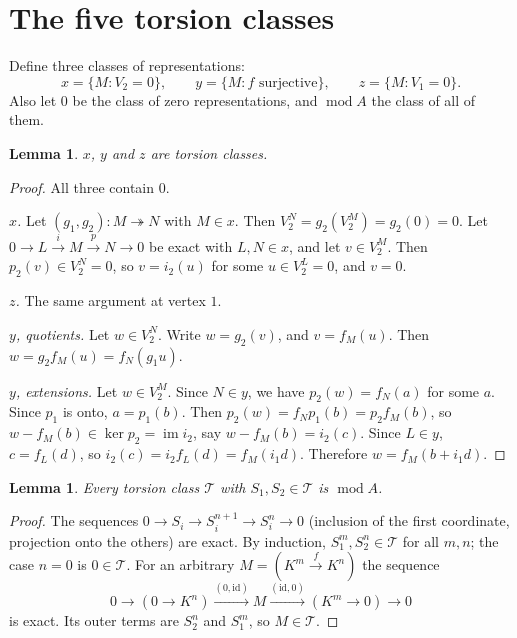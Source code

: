 \documentclass[11pt]{article}
\newtheorem{lemma}[theorem]{Lemma}
\theoremstyle{definition}
\theoremstyle{remark}
\newcommand{\md}{\operatorname{mod}}
\begin{document}
\section{The five torsion classes}

Define three classes of representations:
\[
x=\{M: V_2=0\},\qquad y=\{M: f\text{ surjective}\},\qquad z=\{M: V_1=0\}.
\]
Also let $0$ be the class of zero representations, and $\md A$ the class of all of them.

\begin{lemma}\label{lem:tors}
$x$, $y$ and $z$ are torsion classes.
\end{lemma}
\begin{proof}
All three contain $0$.

\emph{$x$.} Let $(g_1,g_2)\colon M\twoheadrightarrow N$ with $M\in x$. Then
$V_2^N=g_2(V_2^M)=g_2(0)=0$. Let $0\to L\xrightarrow{i}M\xrightarrow{p}N\to0$ be exact with
$L,N\in x$, and let $v\in V_2^M$. Then $p_2(v)\in V_2^N=0$, so $v=i_2(u)$ for some
$u\in V_2^L=0$, and $v=0$.

\emph{$z$.} The same argument at vertex $1$.

\emph{$y$, quotients.} Let $w\in V_2^N$. Write $w=g_2(v)$, and $v=f_M(u)$. Then
$w=g_2f_M(u)=f_N(g_1u)$.

\emph{$y$, extensions.} Let $w\in V_2^M$. Since $N\in y$, we have $p_2(w)=f_N(a)$ for some $a$.
Since $p_1$ is onto, $a=p_1(b)$. Then $p_2(w)=f_Np_1(b)=p_2f_M(b)$, so
$w-f_M(b)\in\ker p_2=\operatorname{im} i_2$, say $w-f_M(b)=i_2(c)$. Since $L\in y$, $c=f_L(d)$,
so $i_2(c)=i_2f_L(d)=f_M(i_1d)$. Therefore $w=f_M(b+i_1d)$.
\end{proof}

\begin{lemma}\label{lem:all}
Every torsion class $\mathcal T$ with $S_1,S_2\in\mathcal T$ is $\md A$.
\end{lemma}
\begin{proof}
The sequences $0\to S_i\to S_i^{n+1}\to S_i^n\to0$ (inclusion of the first coordinate,
projection onto the others) are exact. By induction, $S_1^m,S_2^n\in\mathcal T$ for all $m,n$;
the case $n=0$ is $0\in\mathcal T$. For an arbitrary $M=(K^{m}\xrightarrow{f}K^{n})$ the sequence
\[
0\to(0\to K^n)\xrightarrow{(0,\mathrm{id})}M\xrightarrow{(\mathrm{id},0)}(K^m\to0)\to0
\]
is exact. Its outer terms are $S_2^n$ and $S_1^m$, so $M\in\mathcal T$.
\end{proof}
\end{document}
